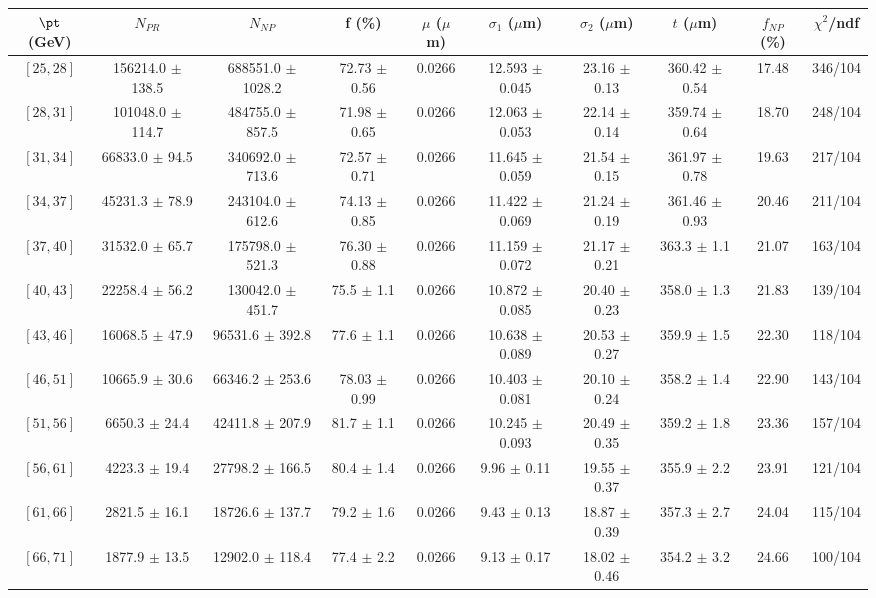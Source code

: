 \begin{tabular}{c||c|c|c|c|c|c|c||c|c}
$\pt$ (GeV) & $N_{PR}$ & $N_{NP}$ & f (\%) & $\mu$ ($\mu$m) & $\sigma_1$ ($\mu$m) & $\sigma_2$ ($\mu$m)  & $t$ ($\mu$m) & $f_{NP}$ (\%) & $\chi^2$/ndf \\
\hline
$[25, 28]$ & 156214.0 $\pm$ 138.5 & 688551.0 $\pm$ 1028.2 & 72.73 $\pm$ 0.56 & 0.0266 & 12.593 $\pm$ 0.045 & 23.16 $\pm$ 0.13 & 360.42 $\pm$ 0.54 & 17.48 & 346/104\\
$[28, 31]$ & 101048.0 $\pm$ 114.7 & 484755.0 $\pm$ 857.5 & 71.98 $\pm$ 0.65 & 0.0266 & 12.063 $\pm$ 0.053 & 22.14 $\pm$ 0.14 & 359.74 $\pm$ 0.64 & 18.70 & 248/104\\
$[31, 34]$ & 66833.0 $\pm$ 94.5 & 340692.0 $\pm$ 713.6 & 72.57 $\pm$ 0.71 & 0.0266 & 11.645 $\pm$ 0.059 & 21.54 $\pm$ 0.15 & 361.97 $\pm$ 0.78 & 19.63 & 217/104\\
$[34, 37]$ & 45231.3 $\pm$ 78.9 & 243104.0 $\pm$ 612.6 & 74.13 $\pm$ 0.85 & 0.0266 & 11.422 $\pm$ 0.069 & 21.24 $\pm$ 0.19 & 361.46 $\pm$ 0.93 & 20.46 & 211/104\\
$[37, 40]$ & 31532.0 $\pm$ 65.7 & 175798.0 $\pm$ 521.3 & 76.30 $\pm$ 0.88 & 0.0266 & 11.159 $\pm$ 0.072 & 21.17 $\pm$ 0.21 & 363.3 $\pm$ 1.1 & 21.07 & 163/104\\
$[40, 43]$ & 22258.4 $\pm$ 56.2 & 130042.0 $\pm$ 451.7 & 75.5 $\pm$ 1.1 & 0.0266 & 10.872 $\pm$ 0.085 & 20.40 $\pm$ 0.23 & 358.0 $\pm$ 1.3 & 21.83 & 139/104\\
$[43, 46]$ & 16068.5 $\pm$ 47.9 & 96531.6 $\pm$ 392.8 & 77.6 $\pm$ 1.1 & 0.0266 & 10.638 $\pm$ 0.089 & 20.53 $\pm$ 0.27 & 359.9 $\pm$ 1.5 & 22.30 & 118/104\\
$[46, 51]$ & 10665.9 $\pm$ 30.6 & 66346.2 $\pm$ 253.6 & 78.03 $\pm$ 0.99 & 0.0266 & 10.403 $\pm$ 0.081 & 20.10 $\pm$ 0.24 & 358.2 $\pm$ 1.4 & 22.90 & 143/104\\
$[51, 56]$ & 6650.3 $\pm$ 24.4 & 42411.8 $\pm$ 207.9 & 81.7 $\pm$ 1.1 & 0.0266 & 10.245 $\pm$ 0.093 & 20.49 $\pm$ 0.35 & 359.2 $\pm$ 1.8 & 23.36 & 157/104\\
$[56, 61]$ & 4223.3 $\pm$ 19.4 & 27798.2 $\pm$ 166.5 & 80.4 $\pm$ 1.4 & 0.0266 & 9.96 $\pm$ 0.11 & 19.55 $\pm$ 0.37 & 355.9 $\pm$ 2.2 & 23.91 & 121/104\\
$[61, 66]$ & 2821.5 $\pm$ 16.1 & 18726.6 $\pm$ 137.7 & 79.2 $\pm$ 1.6 & 0.0266 & 9.43 $\pm$ 0.13 & 18.87 $\pm$ 0.39 & 357.3 $\pm$ 2.7 & 24.04 & 115/104\\
$[66, 71]$ & 1877.9 $\pm$ 13.5 & 12902.0 $\pm$ 118.4 & 77.4 $\pm$ 2.2 & 0.0266 & 9.13 $\pm$ 0.17 & 18.02 $\pm$ 0.46 & 354.2 $\pm$ 3.2 & 24.66 & 100/104\\

\end{tabular}
